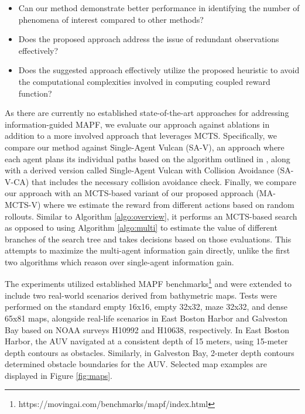 \documentclass[letterpaper, 10 pt, conference]{IEEEConference}
\begin{document}
\begin{itemize}[noitemsep, align=left]
\item[\textbf{Q1:}] Can our method demonstrate better performance in identifying the number of phenomena of interest compared to other methods?
\item[\textbf{Q2:}] Does the proposed approach address the issue of redundant observations effectively?
\item[\textbf{Q3:}] Does the suggested approach effectively utilize the proposed heuristic to avoid the computational complexities involved in computing coupled reward function?
\end{itemize}

As there are currently no established state-of-the-art approaches for addressing information-guided MAPF, we evaluate our approach against ablations in addition to a more involved approach that leverages MCTS. Specifically, we compare our method against Single-Agent Vulcan (SA-V), an approach where each agent plans its individual paths based on the algorithm outlined in \cite{ayton2017}, along with a derived version called Single-Agent Vulcan with Collision Avoidance (SA-V-CA) that includes the necessary collision avoidance check. Finally, we compare our approach with an MCTS-based variant of our proposed approach (MA-MCTS-V) where we estimate the reward from different actions based on random rollouts. Similar to Algorithm \ref{algo:overview}, it performs an MCTS-based search as opposed to using Algorithm \ref{algo:multi} to estimate the value of different branches of the search tree and takes decisions based on those evaluations. This attempts to maximize the multi-agent information gain directly, unlike the first two algorithms which reason over single-agent information gain.

The experiments utilized established MAPF benchmarks\footnote{https://movingai.com/benchmarks/mapf/index.html} \cite{mapf_benchmarks} and were extended to include two real-world scenarios derived from bathymetric maps. Tests were performed on the standard empty 16x16, empty 32x32, maze 32x32, and dense 65x81 maps, alongside real-life scenarios in East Boston Harbor and Galveston Bay based on NOAA surveys H10992 and H10638, respectively. In East Boston Harbor, the AUV navigated at a consistent depth of 15 meters, using 15-meter depth contours as obstacles. Similarly, in Galveston Bay, 2-meter depth contours determined obstacle boundaries for the AUV. Selected map examples are displayed in Figure \ref{fig:maps}.
\end{document}
